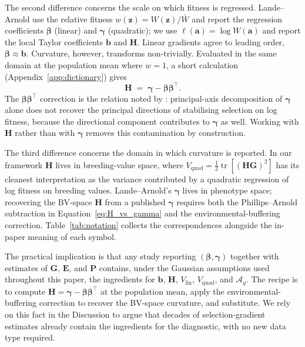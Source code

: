 \documentclass[9pt,twocolumn,twoside,lineno]{gsajnl}
\newcommand{\vect}[1]{\boldsymbol{#1}}
\newcommand{\mat}[1]{\mathbf{#1}}
\newcommand{\tr}{\ensuremath{\operatorname{tr}}\xspace}
\newcommand{\Ag}{\ensuremath{\mathcal{A}_{g}}\xspace}
\newcommand{\Vlin}{\ensuremath{V_{\text{lin}}}\xspace}
\newcommand{\Vquad}{\ensuremath{V_{\text{quad}}}\xspace}
\begin{document}
The second difference concerns the scale on which fitness is regressed. Lande--Arnold use the relative fitness $w(\vect{z}) = W(\vect{z})/\bar{W}$ and report the regression coefficients $\bm{\beta}$ (linear) and $\bm{\gamma}$ (quadratic); we use $\ell(\vect{a}) = \log W(\vect{a})$ and report the local Taylor coefficients $\vect{b}$ and $\mat{H}$. Linear gradients agree to leading order, $\bm{\beta} \approx \vect{b}$. Curvature, however, transforms non-trivially. Evaluated in the same domain at the population mean where $w=1$, a short calculation (Appendix~\ref{app:dictionary}) gives
\begin{equation}
\mat{H} \;=\; \bm{\gamma}-\bm{\beta}\bm{\beta}^{\top}.
\label{eq:H_vs_gamma}
\end{equation}
The $\bm{\beta}\bm{\beta}^{\top}$ correction is the relation noted by \citet{PhillipsArnold1989}: principal-axis decomposition of $\bm{\gamma}$ alone does not recover the principal directions of stabilising selection on log fitness, because the directional component contributes to $\bm{\gamma}$ as well. Working with $\mat{H}$ rather than with $\bm{\gamma}$ removes this contamination by construction.

The third difference concerns the domain in which curvature is reported. In our framework $\mat{H}$ lives in breeding-value space, where $\Vquad = \tfrac{1}{2}\tr[(\mat{H}\mat{G})^2]$ has its cleanest interpretation as the variance contributed by a quadratic regression of log fitness on breeding values. Lande--Arnold's $\bm{\gamma}$ lives in phenotype space; recovering the BV-space $\mat{H}$ from a published $\bm{\gamma}$ requires both the Phillips--Arnold subtraction in Equation~\eqref{eq:H_vs_gamma} and the environmental-buffering correction. Table~\ref{tab:notation} collects the correspondences alongside the in-paper meaning of each symbol.

The practical implication is that any study reporting $(\bm{\beta},\bm{\gamma})$ together with estimates of $\mat{G}$, $\mat{E}$, and $\mat{P}$ contains, under the Gaussian assumptions used throughout this paper, the ingredients for $\vect{b}$, $\mat{H}$, $\Vlin$, $\Vquad$, and \Ag. The recipe is to compute $\mat{H} = \bm{\gamma}-\bm{\beta}\bm{\beta}^{\top}$ at the population mean, apply the environmental-buffering correction to recover the BV-space curvature, and substitute. We rely on this fact in the Discussion to argue that decades of selection-gradient estimates already contain the ingredients for the diagnostic, with no new data type required.
\end{document}

